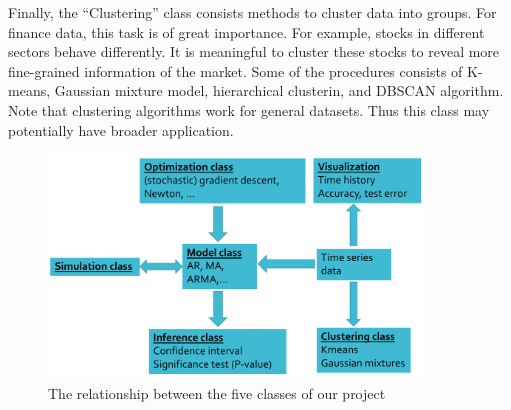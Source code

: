 Finally, the ``Clustering'' class consists methods to cluster data into groups. For finance data, this task is of great importance. For example, stocks in different sectors behave differently. It is meaningful to cluster these stocks to reveal more fine-grained information of the market. Some of the procedures consists of K-means, Gaussian mixture model, hierarchical clusterin, and DBSCAN algorithm. Note that clustering algorithms work for general datasets. Thus this class may potentially have broader application. 

\begin{figure}[htbp]
\begin{center}
\includegraphics[width = 10cm]{./Figures/flowchart.png}
\caption{The relationship between the five classes of our project}
\label{default}
\end{center}
\end{figure}

